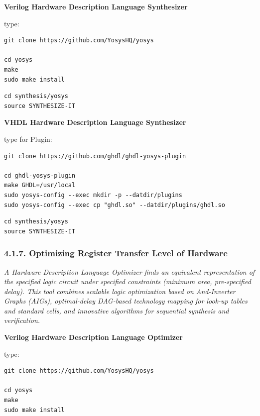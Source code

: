 \documentclass[
]{article}
\begin{document}
\textbf{Verilog Hardware Description Language Synthesizer}

type:

\begin{verbatim}
git clone https://github.com/YosysHQ/yosys

cd yosys
make
sudo make install
\end{verbatim}

\begin{verbatim}
cd synthesis/yosys
source SYNTHESIZE-IT
\end{verbatim}

\textbf{VHDL Hardware Description Language Synthesizer}

type for Plugin:

\begin{verbatim}
git clone https://github.com/ghdl/ghdl-yosys-plugin

cd ghdl-yosys-plugin
make GHDL=/usr/local
sudo yosys-config --exec mkdir -p --datdir/plugins
sudo yosys-config --exec cp "ghdl.so" --datdir/plugins/ghdl.so
\end{verbatim}

\begin{verbatim}
cd synthesis/yosys
source SYNTHESIZE-IT
\end{verbatim}

\hypertarget{optimizing-register-transfer-level-of-hardware-1}{%
\subsubsection{4.1.7. Optimizing Register Transfer Level of
Hardware}\label{optimizing-register-transfer-level-of-hardware-1}}

\emph{A Hardware Description Language Optimizer finds an equivalent
representation of the specified logic circuit under specified
constraints (minimum area, pre-specified delay). This tool combines
scalable logic optimization based on And-Inverter Graphs (AIGs),
optimal-delay DAG-based technology mapping for look-up tables and
standard cells, and innovative algorithms for sequential synthesis and
verification.}

\textbf{Verilog Hardware Description Language Optimizer}

type:

\begin{verbatim}
git clone https://github.com/YosysHQ/yosys

cd yosys
make
sudo make install
\end{verbatim}
\end{document}
